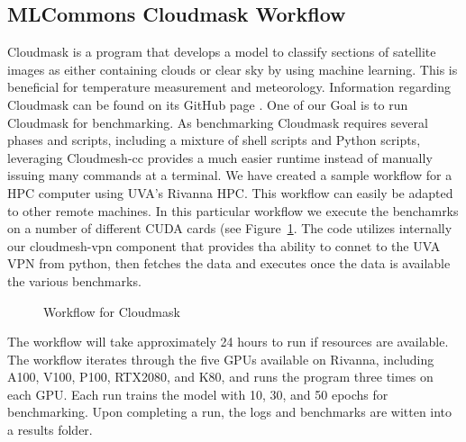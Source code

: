 
\subsection{MLCommons Cloudmask Workflow}
\label{cloudmask-workflow}

Cloudmask is a program that develops a model to classify sections of
satellite images as either containing clouds or clear sky by using
machine learning. This is beneficial for temperature measurement and
meteorology.  Information regarding Cloudmask can be found on its
GitHub page \cite{www-cloudmask}.
One of our Goal is to run Cloudmask for benchmarking.
As benchmarking Cloudmask requires
several phases and scripts, including a mixture of shell scripts and
Python scripts, leveraging Cloudmesh-cc provides a much easier runtime
instead of manually issuing many commands at a terminal.
We have created a sample workflow for a HPC
computer using UVA's Rivanna HPC. 
This workflow can easily be adapted to other remote machines. In this
particular workflow we execute the benchamrks on a number of different
CUDA cards (see Figure~\ref{fig:cloudmaskwf}. The code utilizes
internally our cloudmesh-vpn component that provides tha ability to
connet to the UVA VPN from python, then fetches the data and executes
once the data is available the various benchmarks.

\label{fig:cloudmaskwf}


\begin{figure}[htb]
  \vspace{-1cm}
  \caption{Workflow for Cloudmask}\label{fig:cloudmaskwf}
\end{figure}



The workflow will take approximately 24 hours to run if resources are
available. The workflow iterates through the five GPUs available on
Rivanna, including A100, V100, P100, RTX2080, and K80, and runs the program
three times on each GPU. Each run trains the model with 10, 30, and 50
epochs for benchmarking.  Upon completing a run, the logs and
benchmarks are witten into a results folder.

